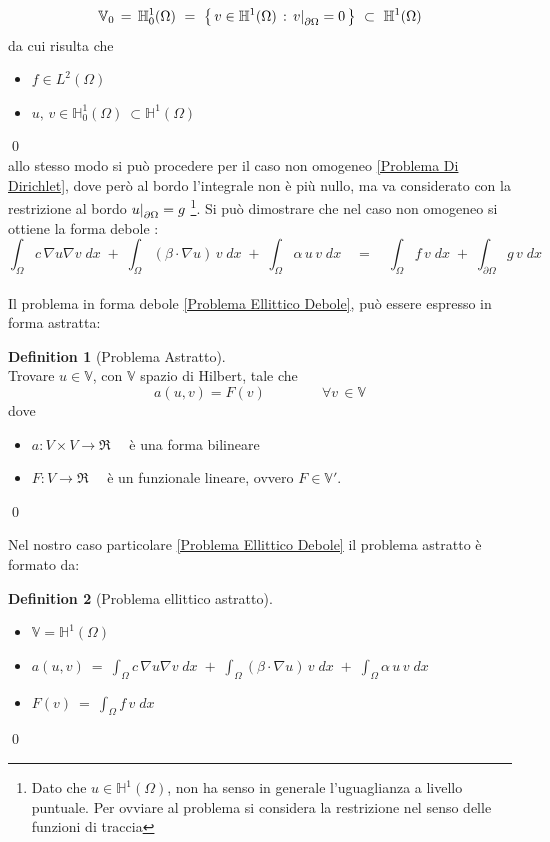 \documentclass[12pt,a4paper]{report}
\theoremstyle{theorem}
\theoremstyle{theorem}
\theoremstyle{definition}
\newtheorem{definition}{Definition}[section]
\newcommand\restr[2]{{%
  \left.\kern-\nulldelimiterspace %
  #1 %
  \right|_{#2} %
  }}
\begin{document}
\[  \mathbb{V}_{0} \, = \, \mathbb{H}_{0}^{1}(\Omega) \ = \ \left \{ \, v \in \mathbb{H}^{1}(\Omega) \, :  \, \restr{v}{\partial \Omega} = 0 \, \right \} \ \subset \  \mathbb{H}^1(\Omega) \]
da cui risulta che
\begin{itemize}
	\item $f \in L^{2}(\Omega)$
	\item $u, \, v \in \mathbb{H}_{0}^{1}(\Omega) \ \subset \mathbb{H}^{1}(\Omega)$
\end{itemize}
\qed
\hfill \\
allo stesso modo si può procedere per il caso non omogeneo \ref{Problema Di Dirichlet}, dove però al bordo l'integrale non è più nullo, ma va considerato con la restrizione al bordo $\restr{u}{\partial \Omega} = g$ \footnote{Dato che $u \in \mathbb{H}^{1}(\Omega)$, non ha senso in generale l'uguaglianza a livello puntuale. Per ovviare al problema si considera la restrizione nel senso delle funzioni di traccia}. Si può dimostrare che nel caso non omogeneo si ottiene la forma debole \label{Problema Ellittico Debole Non Omogeneo} :
\[ \int_{\Omega}{c \, \nabla u \nabla v \; dx} \; + \; \int_{\Omega}{(\beta \cdot \nabla u) \, v \; dx} \; + \; \int_{\Omega}{\alpha \, u \, v \; dx} \quad = \quad \int_{\Omega}{f \, v \; dx} \; + \; \int_{\partial\Omega}{g \, v \; dx}\]
\hfill \\
Il problema in forma debole \ref{Problema Ellittico Debole}, può essere espresso in forma astratta:
\begin{definition} [Problema Astratto]  \label{Problema Astratto}
\hfill \\
Trovare $u \in  \mathbb{V}$, con $\mathbb{V}$ spazio di Hilbert, tale che
\[ a(u,v) = F(v) \qquad \qquad \forall v \, \in \mathbb{V} \]
dove
\begin{itemize}
	\item $a: V \times V \rightarrow \Re \quad $ è una forma bilineare 
	\item $F: V \rightarrow \Re \quad $ è un funzionale lineare, ovvero $F \in \mathbb{V}'$.
\end{itemize}
\qed
\end{definition}
Nel nostro caso particolare \ref{Problema Ellittico Debole}  il problema astratto è formato da:
\begin{definition} [Problema ellittico astratto]  \label{Problema Ellittico Astratto}
\hfill \\
\begin{itemize}
	\item $\mathbb{V} = \mathbb{H}^1(\Omega)$
	\item $a(u,v) \ = \ \int_{\Omega}{c \, \nabla u \nabla v \; dx} \; + \; \int_{\Omega}{(\beta \cdot \nabla u) \, v \; dx} \; + \; \int_{\Omega}{\alpha \, u \, v \; dx}$
	\item $F(v) \ = \ \int_{\Omega}{f \, v \; dx}$
\end{itemize}
\qed
\end{definition}
\end{document}
